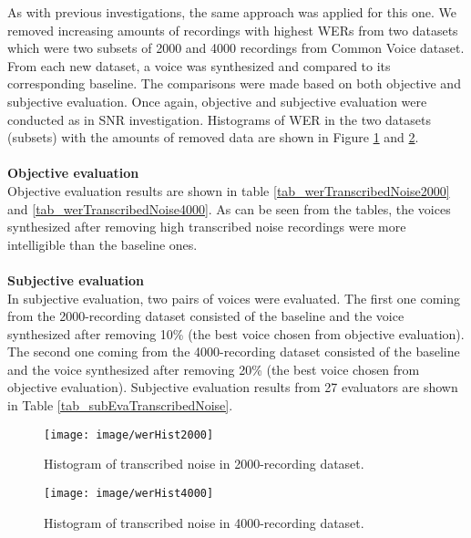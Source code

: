 \documentclass[12pt]{article}
\begin{document}
As with previous investigations, the same approach was applied for this one. We removed increasing amounts of recordings with highest WERs from two datasets which were two subsets of 2000 and 4000 recordings from Common Voice dataset. From each new dataset, a voice was synthesized and compared to its corresponding baseline. The comparisons were made based on both objective and subjective evaluation. Once again, objective and subjective evaluation were conducted as in SNR investigation. Histograms of WER in the two datasets (subsets) with the amounts of removed data are shown in Figure \ref{fig_transcribedNoiseHist2000} and \ref{fig_transcribedNoiseHist4000}.\\\\
\textbf{Objective evaluation}
\vspace{0.28cm}\\
Objective evaluation results are shown in table \ref{tab_werTranscribedNoise2000} and \ref{tab_werTranscribedNoise4000}. As can be seen from the tables, the voices synthesized after removing high transcribed noise recordings were more intelligible than the baseline ones.\\\\
\textbf{Subjective evaluation}
\vspace{0.28cm}\\
In subjective evaluation, two pairs of voices were evaluated. The first one coming from the 2000-recording dataset consisted of the baseline and the voice synthesized after removing 10\% (the best voice chosen from objective evaluation). The second one coming from the 4000-recording dataset consisted of the baseline and the voice synthesized after removing 20\% (the best voice chosen from objective evaluation). Subjective evaluation results from 27 evaluators are shown in Table \ref{tab_subEvaTranscribedNoise}.

\begin{figure}[t]
\begin{center}
\texttt{[image: image/werHist2000]}
\end{center}
\vspace{-0.3cm}
\caption[Histogram of transcribed noise in 2000-recording dataset.]{Histogram of transcribed noise in 2000-recording dataset.}
\label{fig_transcribedNoiseHist2000}
\end{figure}

\begin{figure}[t]
\begin{center}
\texttt{[image: image/werHist4000]}
\end{center}
\vspace{-0.3cm}
\caption[Histogram of transcribed noise in 4000-recording dataset.]{Histogram of transcribed noise in 4000-recording dataset.}
\label{fig_transcribedNoiseHist4000}
\end{figure}
\end{document}
